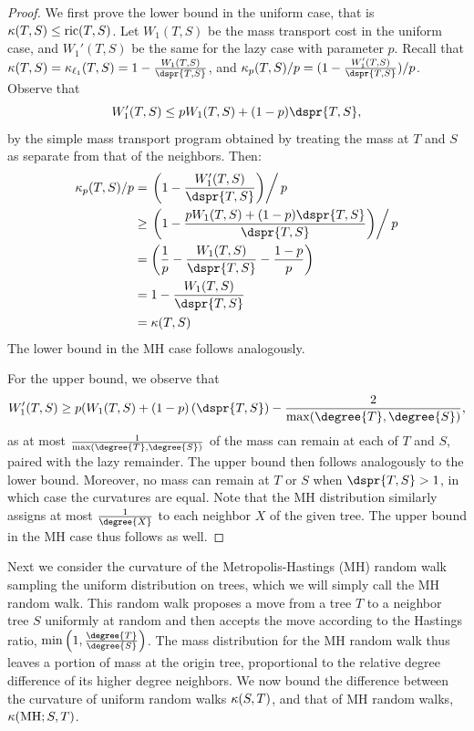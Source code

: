 \documentclass[11pt,onecolumn,conference]{IEEEtran}
\newcommand{\MH}{\operatorname{MH}}
\newcommand{\curvature}[2][]{%
    \ifthenelse{\equal{#1}{}}%
		{\kappa(#2)}%
		{\kappa_{#1}(#2)}%
}
\newcommand{\ric}[1]{
	\operatorname{ric}(#1)%
}
\begin{document}
\begin{proof}
	We first prove the lower bound in the uniform case, that is $\curvature{T,S} \le \ric{T,S}$.
	Let $W_1(T,S)$ be the mass transport cost in the uniform case, and $W_1'(T,S)$ be the same for the lazy case with parameter $p$.
	Recall that $\curvature{T,S} = \curvature[\ell_1]{T,S} = 1 - \frac{W_1(T,S)}{\dspr{T,S}}$, and $\curvature[p]{T,S} / p = (1 - \frac{W_1'(T,S)}{\dspr{T,S}}) / p$.
	Observe that $$W_1'(T,S) \le pW_1(T,S) + (1-p)\dspr{T,S},$$ by the simple mass transport program obtained by treating the mass at $T$ and $S$ as separate from that of the neighbors.
	Then:
	\begin{align*}
		\curvature[p]{T,S} /p &= \left. \left(1 - \frac{W_1'(T,S)}{\dspr{T,S}}\right) \right/ p \\
		&\ge \left. \left(1 - \frac{pW_1(T,S) + (1-p)\dspr{T,S}}{\dspr{T,S}}\right) \right/ p \\
		&= \left(\frac{1}{p} - \frac{W_1(T,S)}{\dspr{T,S}} - \frac{1-p}{p}\right) \\
		&= 1 - \frac{W_1(T,S)}{\dspr{T,S}} \\
		&= \curvature{T,S}
	\end{align*}
The lower bound in the MH case follows analogously.

	For the upper bound, we observe that $$W_1'(T,S) \ge p(W_1(T,S) + (1-p)\left(\dspr{T,S}\right) - \frac{2}{\max(\degree{T}, \degree{S})},$$ as at most $\frac{1}{\max(\degree{T},\degree{S})}$ of the mass can remain at each of $T$ and $S$, paired with the lazy remainder.
	The upper bound then follows analogously to the lower bound.
	Moreover, no mass can remain at $T$ or $S$ when $\dspr{T,S} > 1$, in which case the curvatures are equal.
Note that the MH distribution similarly assigns at most $\frac{1}{\degree{X}}$ to each neighbor $X$ of the given tree.
The upper bound in the MH case thus follows as well.
\end{proof}

Next we consider the curvature of the Metropolis-Hastings (MH) random walk sampling the uniform distribution on trees, which we will simply call the MH random walk.
This random walk proposes a move from a tree $T$ to a neighbor tree $S$ uniformly at random and then accepts the move according to the Hastings ratio, $\min\left(1, \frac{\degree{T}}{\degree{S}}\right)$.
The mass distribution for the MH random walk thus leaves a portion of mass at the origin tree, proportional to the relative degree difference of its higher degree neighbors.
We now bound the difference between the curvature of uniform random walks $\curvature{S,T}$, and that of MH random walks, $\curvature{\MH; S,T}$.
\end{document}
